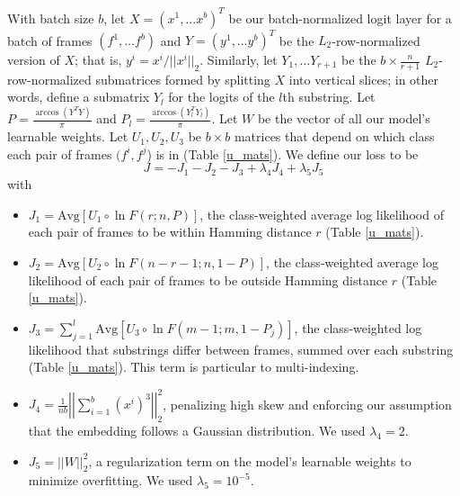 \documentclass{article}
\begin{document}
\begin{multicols}{2}
With batch size $b$, let $X = (x^1, \ldots x^b)^T$ be our batch-normalized logit layer for a batch of frames $(f^1, \ldots f^b)$ and $Y = (y^1, \ldots y^b)^T$ be the $L_2$-row-normalized version of $X$; that is, $y^i = x^i / ||x^i||_2$.
Similarly, let $Y_1, \ldots Y_{r +1}$ be the $b \times \frac{n}{r + 1}$ $L_2$-row-normalized submatrices formed by splitting $X$ into vertical slices; in other words, define a submatrix $Y_l$ for the logits of the $l$th substring.
Let $P = \frac{\arccos\left(Y^TY\right)}{\pi}$ and $P_l = \frac{\arccos\left(Y_l^TY_l\right)}{\pi}$.%
Let $W$ be the vector of all our model's learnable weights.
Let $U_1, U_2, U_3$ be $b\times b$ matrices that depend on which class each pair of frames $(f^i, f^j$) is in (Table \ref{u_mats}).
We define our loss to be
\[J = -J_1 - J_2 - J_3 + \lambda_4J_4 + \lambda_5J_5\]
with
\begin{itemize}
\item $J_1 = \text{Avg}\left[U_1\circ\ln F\left(r; n, P\right)\right]$, the class-weighted average log likelihood of each pair of frames to be within Hamming distance $r$ (Table \ref{u_mats}).
\item $J_2 = \text{Avg}\left[U_2\circ\ln F\left(n - r - 1; n, 1 - P\right)\right]$, the class-weighted average log likelihood of each pair of frames to be outside Hamming distance $r$ (Table \ref{u_mats}). 
\item $J_3 = \sum_{j=1}^l\text{Avg}\left[U_3\circ\ln F\left(m - 1; m, 1 - P_j\right)\right]$, the class-weighted log likelihood that substrings differ between frames, summed over each substring (Table \ref{u_mats}). This term is particular to multi-indexing.
\item $J_4 = \frac{1}{nb}\left|\left|\sum_{i=1}^b(x^i)^3\right|\right|_2^2$, penalizing high skew and enforcing our assumption that the embedding follows a Gaussian distribution. We used $\lambda_4 = 2$.
\item $J_5 = ||W||_2^2$, a regularization term on the model's learnable weights to minimize overfitting. We used $\lambda_5 = 10^{-5}$.
\end{itemize}


\end{multicols}
\end{document}
